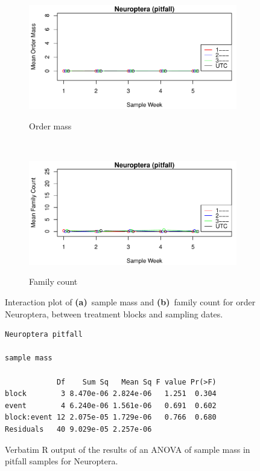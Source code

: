 \documentclass[10pt,letterpaper,twocolumn]{article}
\begin{document}
\begin{figure}[h]
	\centering
	\begin{subfigure}[b]{0.45\textwidth}
		\caption{Order mass}
		\includegraphics[width=\textwidth]{plots/blocks/interaction/mass/mass_pitfall_Neuroptera_interplot.pdf}
		\label{fig:pitfall_neuroptera_mass_interplot}
	\end{subfigure}
	~
	\begin{subfigure}[b]{0.45\textwidth}
		\caption{Family count}
		\includegraphics[width=\textwidth]{plots/blocks/interaction/family/family_pitfall_Neuroptera_interplot.pdf}
		\label{fig:pitfall_neuroptera_family_interplot}
	\end{subfigure}
	\caption{Interaction plot of \textbf{(a)}~sample mass and \textbf{(b)}~family count for order Neuroptera, between treatment blocks and sampling dates.}
	\label{fig:pitfall_neuroptera_interplot}
	\smallskip
	\nointerlineskip
	\hrulefill
\end{figure}

\begin{figure}[h]
	\lstset{numbers=left}
	\lstset{xleftmargin=5mm,framexleftmargin=5mm}
	\begin{lstlisting}
Neuroptera pitfall 

sample mass 

            Df    Sum Sq   Mean Sq F value Pr(>F)
block        3 8.470e-06 2.824e-06   1.251  0.304
event        4 6.240e-06 1.561e-06   0.691  0.602
block:event 12 2.075e-05 1.729e-06   0.766  0.680
Residuals   40 9.029e-05 2.257e-06               
	\end{lstlisting}
	\caption{Verbatim R output of the results of an ANOVA of sample mass in pitfall samples for Neuroptera.}
	\label{fig:pitfall_neuroptera_mass_anova}
	\smallskip
	\nointerlineskip
	\hrulefill
\end{figure}
\end{document}
